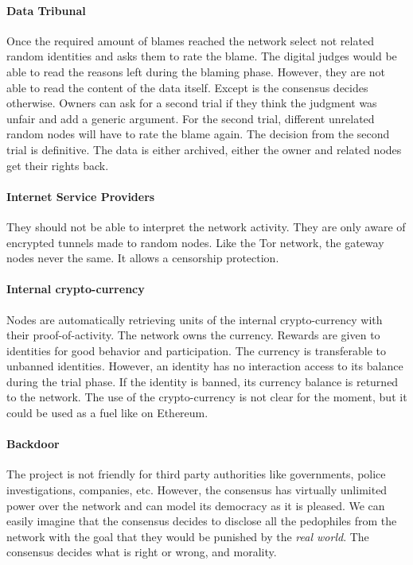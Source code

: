 \paragraph{Data Tribunal} Once the required amount of blames reached the network select not related random identities and asks them to rate the blame. The digital judges would be able to read the reasons left during the blaming phase. However, they are not able to read the content of the data itself. Except is the consensus decides otherwise. Owners can ask for a second trial if they think the judgment was unfair and add a generic argument. For the second trial, different unrelated random nodes will have to rate the blame again. The decision from the second trial is definitive. The data is either archived, either the owner and related nodes get their rights back.

\paragraph{Internet Service Providers} They should not be able to interpret the network activity. They are only aware of encrypted tunnels made to random nodes. Like the Tor network, the gateway nodes never the same. It allows a censorship protection.

\paragraph{Internal crypto-currency} Nodes are automatically retrieving units of the internal crypto-currency with their proof-of-activity. The network owns the currency. Rewards are given to identities for good behavior and participation. The currency is transferable to unbanned identities. However, an identity has no interaction access to its balance during the trial phase. If the identity is banned, its currency balance is returned to the network. The use of the crypto-currency is not clear for the moment, but it could be used as a fuel like on Ethereum\cite{Ethereum2016EthereumDocumentation}.

\paragraph{Backdoor} The project is not friendly for third party authorities like governments, police investigations, companies, etc. However, the consensus has virtually unlimited power over the network and can model its democracy as it is pleased. We can easily imagine that the consensus decides to disclose all the pedophiles from the network with the goal that they would be punished by the \textit{real world}. The consensus decides what is right or wrong, and morality.

